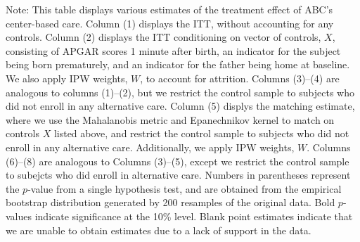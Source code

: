\begin{table}[H]
\begin{threeparttable}
\begin{tabular}{cccccccccc}
  \hline\hline
  \end{tabular}
    \begin{tablenotes}
    \scriptsize
    \item 
Note: This table displays various estimates of the treatment effect of ABC's center-based care.
Column (1) displays the ITT, without accounting for any controls.
Column (2) displays the ITT conditioning on vector of controls, $X$, consisting of APGAR scores 1 
minute after birth, an indicator for the subject being born prematurely, and an indicator for the 
father being home at baseline. We also apply IPW weights, $W$, to account for attrition.
Columns (3)--(4) are analogous to columns (1)--(2), but we restrict the control sample to subjects
who did not enroll in any alternative care.
Column (5) displys the matching estimate, where we use the Mahalanobis metric and Epanechnikov kernel
to match on controls $X$ listed above, and restrict the control sample to subjects who did not enroll
in any alternative care. Additionally, we apply IPW weights, $W$.
Columns (6)--(8) are analogous to Columns (3)--(5), except we restrict the control sample to subejcts
who did enroll in alternative care. 
Numbers in parentheses represent the $p$-value from a single hypothesis test, and are obtained from 
the empirical bootstrap distribution generated by 200 resamples of the original data. 
Bold $p$-values indicate significance at the 10\% level.
Blank point estimates indicate that we are unable to obtain estimates due to a lack of support in the data. 

    \end{tablenotes}
  \end{threeparttable}

\end{table}